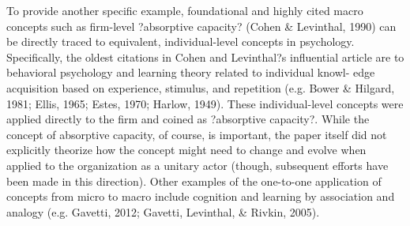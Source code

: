 \documentclass[12pt,letterpaper]{article}
\begin{document}
To provide another specific example, foundational and highly cited macro concepts such as firm-level ?absorptive capacity? (Cohen \& Levinthal, 1990) can be directly traced to equivalent, individual-level concepts in psychology. Specifically, the oldest citations in Cohen and Levinthal?s influential article are to behavioral psychology and learning theory related to individual knowl- edge acquisition based on experience, stimulus, and repetition (e.g. Bower \& Hilgard, 1981; Ellis, 1965; Estes, 1970; Harlow, 1949). These individual-level concepts were applied directly to the firm and coined as ?absorptive capacity?. While the concept of absorptive capacity, of course, is important, the paper itself did not explicitly theorize how the concept might need to change and evolve when applied to the organization as a unitary actor (though, subsequent efforts have been made in this direction). Other examples of the one-to-one application of concepts from micro to macro include cognition and learning by association and analogy (e.g. Gavetti, 2012; Gavetti, Levinthal, \& Rivkin, 2005).
\end{document}
